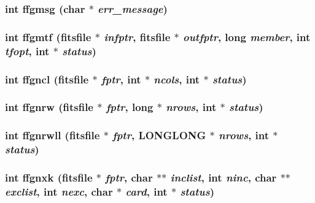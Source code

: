\subsubsection{\setlength{\rightskip}{0pt plus 5cm}int ffgmsg (char $\ast$ {\em err\_\-message})}\label{fitsio_8h_778ec78df3764f3a5928aa564a4874a8}


\subsubsection{\setlength{\rightskip}{0pt plus 5cm}int ffgmtf (\bf{fitsfile} $\ast$ {\em infptr}, \bf{fitsfile} $\ast$ {\em outfptr}, long {\em member}, int {\em tfopt}, int $\ast$ {\em status})}\label{fitsio_8h_f4e42cd31baf4733160bd227bd307256}


\subsubsection{\setlength{\rightskip}{0pt plus 5cm}int ffgncl (\bf{fitsfile} $\ast$ {\em fptr}, int $\ast$ {\em ncols}, int $\ast$ {\em status})}\label{fitsio_8h_766397cd4633ce4b408f9830062893ed}


\subsubsection{\setlength{\rightskip}{0pt plus 5cm}int ffgnrw (\bf{fitsfile} $\ast$ {\em fptr}, long $\ast$ {\em nrows}, int $\ast$ {\em status})}\label{fitsio_8h_92e123ff738eb16143c6f5aa1417aad7}


\subsubsection{\setlength{\rightskip}{0pt plus 5cm}int ffgnrwll (\bf{fitsfile} $\ast$ {\em fptr}, \bf{LONGLONG} $\ast$ {\em nrows}, int $\ast$ {\em status})}\label{fitsio_8h_de18b919b0b4fec8c16e56126d3fb0a0}


\subsubsection{\setlength{\rightskip}{0pt plus 5cm}int ffgnxk (\bf{fitsfile} $\ast$ {\em fptr}, char $\ast$$\ast$ {\em inclist}, int {\em ninc}, char $\ast$$\ast$ {\em exclist}, int {\em nexc}, char $\ast$ {\em card}, int $\ast$ {\em status})}\label{fitsio_8h_19ff4531fbaa18e5979fb079215ad5ce}


